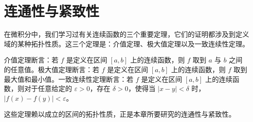 \documentclass[../main.tex]{subfiles}
\begin{document}
\chapter{连通性与紧致性}\label{chapter:ch03-连通性与紧致性}

在微积分中，我们学习过有关连续函数的三个重要定理，它们的证明都涉及到定义域的某种拓扑性质。这三个定理是：介值定理、极大值定理以及一致连续性定理。

介值定理断言：若 $f$ 是定义在区间 $[a,b]$ 上的连续函数，则 $f$ 取到 $a$ 与 $b$ 之间的任意值。极大值定理断言：若 $f$ 是定义在区间 $[a,b]$ 上的连续函数，则 $f$ 取到最大值和最小值。一致连续性定理断言：若 $f$ 是定义在区间 $[a,b]$ 上的连续函数，则对于任意给定的 $\varepsilon>0$，存在 $\delta>0$，使得当 $|x-y|<\delta$ 时，$|f(x)-f(y)|<\varepsilon$。

这些定理赖以成立的区间的拓扑性质，正是本章所要研究的连通性与紧致性。









\end{document}
